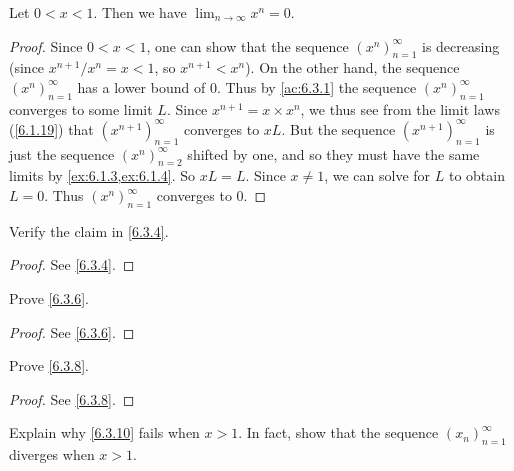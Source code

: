 \begin{prop}\label{6.3.10}
  Let \(0 < x < 1\).
  Then we have \(\lim_{n \to \infty} x^n = 0\).
\end{prop}

\begin{proof}
  Since \(0 < x < 1\), one can show that the sequence \((x^n)_{n = 1}^\infty\) is decreasing
  (since \(x^{n + 1} / x^n = x < 1\), so \(x^{n + 1} < x^n\)).
  On the other hand, the sequence \((x^n)_{n = 1}^\infty\) has a lower bound of \(0\).
  Thus by \cref{ac:6.3.1} the sequence \((x^n)_{n = 1}^\infty\) converges to some limit \(L\).
  Since \(x^{n + 1} = x \times x^n\), we thus see from the limit laws (\cref{6.1.19}) that \((x^{n + 1})_{n = 1}^\infty\) converges to \(xL\).
  But the sequence \((x^{n + 1})_{n = 1}^\infty\) is just the sequence \((x^n)_{n = 2}^\infty\) shifted by one, and so they must have the same limits by \cref{ex:6.1.3,ex:6.1.4}.
  So \(xL = L\).
  Since \(x \neq 1\), we can solve for \(L\) to obtain \(L = 0\).
  Thus \((x^n)_{n = 1}^\infty\) converges to \(0\).
\end{proof}

\exercisesection

\begin{ex}\label{ex:6.3.1}
  Verify the claim in \cref{6.3.4}.
\end{ex}

\begin{proof}
  See \cref{6.3.4}.
\end{proof}

\begin{ex}\label{ex:6.3.2}
  Prove \cref{6.3.6}.
\end{ex}

\begin{proof}
  See \cref{6.3.6}.
\end{proof}

\begin{ex}\label{ex:6.3.3}
  Prove \cref{6.3.8}.
\end{ex}

\begin{proof}
  See \cref{6.3.8}.
\end{proof}

\begin{ex}\label{ex:6.3.4}
  Explain why \cref{6.3.10} fails when \(x > 1\).
  In fact, show that the sequence \((x_n)_{n = 1}^\infty\) diverges when \(x > 1\).
\end{ex}

